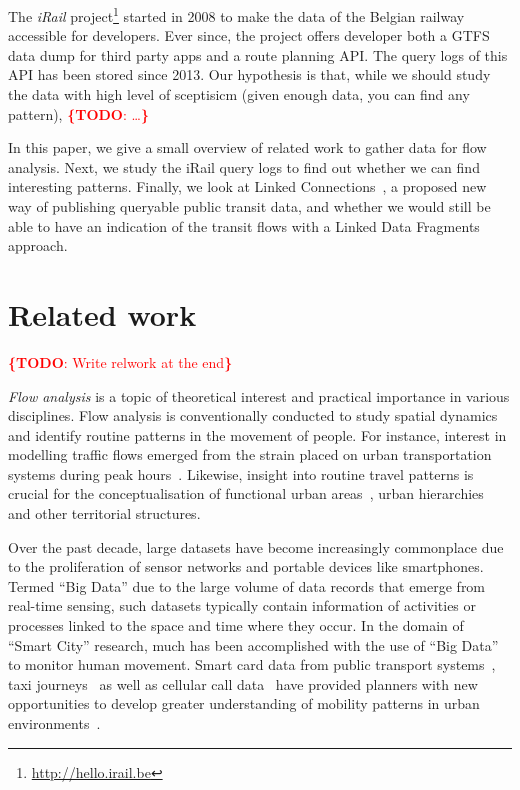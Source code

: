 \documentclass{sig-alternate}
\newcommand{\todo}[1]{\noindent\textcolor{red}{{\bf \{TODO}: #1{\bf \}}}}
\begin{document}
The \emph{iRail} project\footnote{\url{http://hello.irail.be}} started in 2008 to make the data of the Belgian railway accessible for developers.
Ever since, the project offers developer both a GTFS data dump for third party apps and a route planning API.
The query logs of this API has been stored since 2013.
Our hypothesis is that, while we should study the data with high level of sceptisicm (given enough data, you can find any pattern), \todo{\ldots}

In this paper, we give a small overview of related work to gather data for flow analysis.
Next, we study the iRail query logs to find out whether we can find interesting patterns.
Finally, we look at Linked Connections~\cite{lc}, a proposed new way of publishing queryable public transit data, and whether we would still be able to have an indication of the transit flows with a Linked Data Fragments~\cite{ldf} approach.

\section{Related work}
\label{sec:relwork}

\todo{Write relwork at the end}

\emph{Flow analysis} is a topic of theoretical interest and practical importance in various disciplines. 
Flow analysis is conventionally conducted to study spatial dynamics and identify routine patterns in the movement of people.
For instance, interest in modelling traffic flows emerged from the strain placed on urban transportation systems during peak hours~\cite{roth,ferreira}.
Likewise, insight into routine travel patterns is crucial for the conceptualisation of functional urban areas~\cite{servillo,sykora}, urban hierarchies~\cite{christaller} and other territorial structures.

Over the past decade, large datasets have become increasingly commonplace due to the proliferation of sensor networks and portable devices like smartphones.
Termed ``Big Data'' due to the large volume of data records that emerge from real-time sensing\cite{kitchin}, such datasets typically contain information of activities or processes linked to the space and time where they occur.
In the domain of ``Smart City'' research, much has been accomplished with the use of ``Big Data'' to monitor human movement.
Smart card data from public transport systems~\cite{roth,beecham}, taxi journeys~\cite{ferreira} as well as cellular call data~\cite{sevtsuk} have provided planners with new opportunities to develop greater understanding of mobility patterns in urban environments~\cite{batty}.
\end{document}
